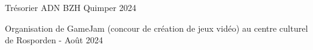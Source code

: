 

\begin{cventries}

  \cventry
    {Trésorier} %
    {ADN BZH} %
    {Quimper} %
    {2024} %
    {
      \begin{cvitems} %
        \item {Organisation de GameJam (concour de création de jeux vidéo) au centre culturel de Rosporden - Août 2024}
      \end{cvitems}
    }
\end{cventries}
